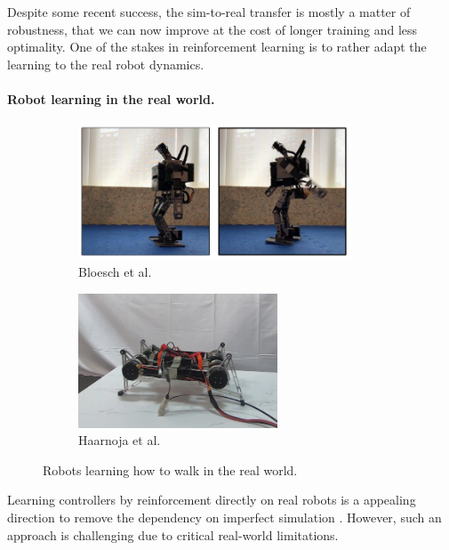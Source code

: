 Despite some recent success, the sim-to-real transfer is mostly a matter of robustness, that we can now improve at the cost of longer training and less optimality. One of the stakes in reinforcement learning is to rather adapt the learning to the real robot dynamics.




\paragraph{Robot learning in the real world.}
\begin{figure}[t]
    \centering
    \captionsetup[subfigure]{justification=centering}
    \begin{subfigure}[t]{0.48\linewidth}
    \includegraphics[width=\textwidth,height=4cm]{Figures/Chapter_SOTA//heess_robot.png}
    \caption{Bloesch et al. \cite{rl_wild_heess_2022}}
    \label{fig:rl_agnostic_robot_0}
    \end{subfigure}
    \begin{subfigure}[t]{0.4\linewidth}
    \includegraphics[width=\textwidth,height=4cm]{Figures/Chapter_SOTA//sergey_rl.png}
    \caption{Haarnoja et al. \cite{sergey_2018}}
    \label{fig:rl_agnostic_robot_1}
    \end{subfigure}
    \caption{Robots learning how to walk in the real world.}
    \label{fig:rl_agnostic_robot}
\end{figure}
Learning controllers by reinforcement directly on real robots is a appealing direction to remove the dependency on imperfect simulation \cite{rl_robotics_survey_2013}.
However, such an approach is challenging due to critical real-world limitations.


